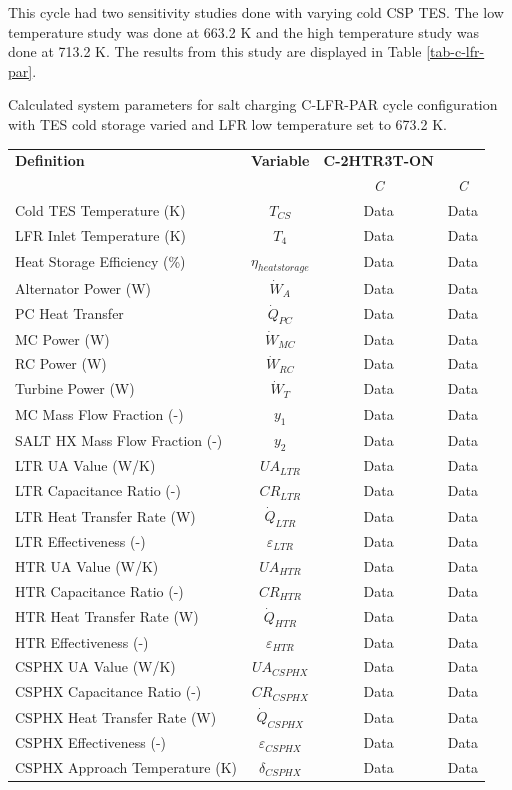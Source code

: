 \begin{paracol}{2}
\linenumbers
\switchcolumn

This cycle had two sensitivity studies done with varying cold CSP TES. The low temperature study was done at 663.2 K and the high temperature study was done at 713.2 K. The results from this study are displayed in Table \ref{tab-c-lfr-par}.

\begin{specialtable}[H]
    \caption{Calculated system parameters for salt charging C-LFR-PAR cycle configuration with TES cold storage varied and LFR low temperature set to 673.2 K.\label{tab-c-lfr-par}}
    \begin{tabular}{lccc}
    \toprule
    \textbf{Definition} & \textbf{Variable} & \textbf{C-2HTR3T-ON} & \\
    & & \textit{C} & \textit{C}\\
    \midrule	
    Cold TES Temperature (K)	&	$T_{CS}$	&	Data	&	Data	\\
    LFR Inlet Temperature (K)	&	$T_{4}$	&	Data	&	Data	\\
    Heat Storage Efficiency (\%)	&	$\eta_{heatstorage}$	&	Data	&	Data	\\
    Alternator Power (W)	&	$\dot{W}_{A}$	&	Data	&	Data	\\
    PC Heat Transfer	&	$\dot{Q}_{PC}$	&	Data	&	Data	\\
    MC Power (W)	&	$\dot{W}_{MC}$	&	Data	&	Data	\\
    RC Power (W)	&	$\dot{W}_{RC}$	&	Data	&	Data	\\
    Turbine Power (W)	&	$\dot{W}_{T}$	&	Data	&	Data	\\
    MC Mass Flow Fraction (-)	&	$y_{1}$	&	Data	&	Data	\\
    SALT HX Mass Flow Fraction (-)	&	$y_{2}$	&	Data	&	Data	\\
    LTR UA Value (W/K)	&	$UA_{LTR}$	&	Data	&	Data	\\
    LTR Capacitance Ratio (-)	&	$CR_{LTR}$	&	Data	&	Data	\\
    LTR Heat Transfer Rate (W)	&	$\dot{Q}_{LTR}$	&	Data	&	Data	\\
    LTR Effectiveness (-)	&	$\varepsilon_{LTR}$	&	Data	&	Data	\\
    HTR UA Value (W/K)	&	$UA_{HTR}$	&	Data	&	Data	\\
    HTR Capacitance Ratio (-)	&	$CR_{HTR}$	&	Data	&	Data	\\
    HTR Heat Transfer Rate (W)	&	$\dot{Q}_{HTR}$	&	Data	&	Data	\\
    HTR Effectiveness (-)	&	$\varepsilon_{HTR}$	&	Data	&	Data	\\
    CSPHX UA Value (W/K)	&	$UA_{CSPHX}$	&	Data	&	Data	\\
    CSPHX Capacitance Ratio (-)	&	$CR_{CSPHX}$	&	Data	&	Data	\\
    CSPHX Heat Transfer Rate (W)	&	$\dot{Q}_{CSPHX}$	&	Data	&	Data	\\
    CSPHX Effectiveness (-)	&	$\varepsilon_{CSPHX}$	&	Data	&	Data	\\
    CSPHX Approach Temperature (K)	&	$\delta_{CSPHX}$	&	Data	&	Data	\\
    

\end{tabular}
\end{specialtable}
\end{paracol}
